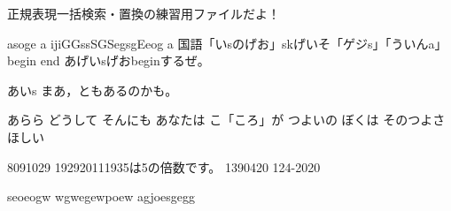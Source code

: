 正規表現一括検索・置換の練習用ファイルだよ！

asoge a ijiGGssSGSegsgEeog {{a 国語「いsのげお」skげい}}そ「ゲジs」「ういんa」
begin
end
あげい{\color{red}sげおbeginするぜ。}
\begin{imadani}
あいs
まあ，とも{\color{white}あるのかも。}
\end{imadani}

あらら	どうして	そんにも
あなたは	こ「ころ」が	つよいの
ぼくは	そのつよさ	ほしい

8091029
192920111935は5の倍数です。
1390420
124-2020

seoeogw
wgwegewpoew
agjoesgegg

